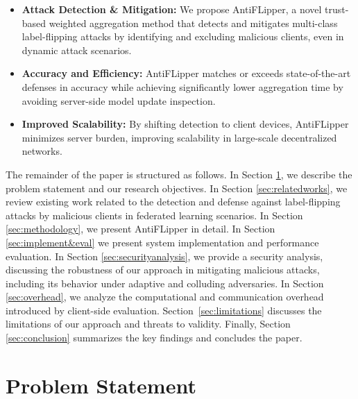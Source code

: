 \documentclass[conference]{IEEEtran}
\begin{document}
\begin{itemize}
   \item \textbf{Attack Detection \& Mitigation:} We propose AntiFLipper, a novel trust-based weighted aggregation method that detects and mitigates multi-class label-flipping attacks by identifying and excluding malicious clients, even in dynamic attack scenarios.

   \item \textbf{Accuracy and Efficiency:} AntiFLipper matches or exceeds state-of-the-art defenses in accuracy while achieving significantly lower aggregation time by avoiding server-side model update inspection.

   \item \textbf{Improved Scalability:} By shifting detection to client devices, AntiFLipper minimizes server burden, improving scalability in large-scale decentralized networks.
    
\end{itemize}


    The remainder of the paper is structured as follows. In Section \ref{sec:problem Statement}, we describe the problem statement and our research objectives. In Section \ref{sec:relatedworks}, we review existing work related to the detection and defense against label-flipping attacks by malicious clients in federated learning scenarios. In Section \ref{sec:methodology}, we present AntiFLipper in detail.  In Section \ref{sec:implement&eval} we present system implementation and performance evaluation. In Section \ref{sec:securityanalysis}, we provide a security analysis, discussing the robustness of our approach in mitigating malicious attacks, including its behavior under adaptive and colluding adversaries. In Section \ref{sec:overhead}, we analyze the computational and communication overhead introduced by client-side evaluation. Section~\ref{sec:limitations} discusses the limitations of our approach and threats to validity. Finally, Section \ref{sec:conclusion} summarizes the key findings and concludes the paper.


\section{Problem Statement}
\label{sec:problem Statement}
\end{document}
